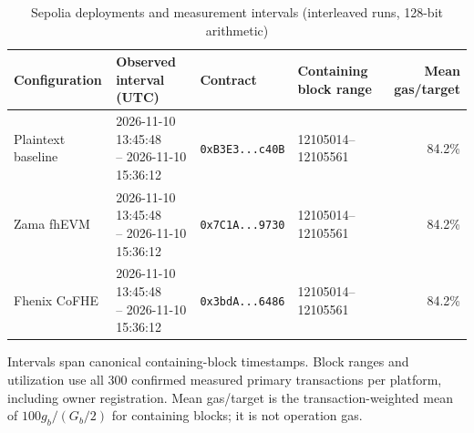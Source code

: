 \begin{table}[!t]
\caption{Sepolia deployments and measurement intervals (interleaved runs, 128-bit arithmetic)}
\label{tab:sepolia-experiment-deployments-128-blockintervals}
\centering
\footnotesize
\setlength{\tabcolsep}{4pt}
\begin{tabular}{|l|l|l|l|r|}
\hline
\textbf{Configuration} &
\textbf{Observed interval (UTC)} &
\textbf{Contract} &
\textbf{Containing block range} &
\textbf{Mean gas/target} \\
\hline
Plaintext baseline &
\shortstack[l]{2026-11-10 13:45:48 \\ -- 2026-11-10 15:36:12} &
\texttt{0xB3E3...c40B} &
12105014--12105561 &
84.2\% \\
\hline
Zama fhEVM &
\shortstack[l]{2026-11-10 13:45:48 \\ -- 2026-11-10 15:36:12} &
\texttt{0x7C1A...9730} &
12105014--12105561 &
84.2\% \\
\hline
Fhenix CoFHE &
\shortstack[l]{2026-11-10 13:45:48 \\ -- 2026-11-10 15:36:12} &
\texttt{0x3bdA...6486} &
12105014--12105561 &
84.2\% \\
\hline
\end{tabular}
\vspace{2pt}
\parbox{\textwidth}{\scriptsize Intervals span canonical containing-block timestamps. Block ranges and utilization use all 300 confirmed measured primary transactions per platform, including owner registration. Mean gas/target is the transaction-weighted mean of $100g_b/(G_b/2)$ for containing blocks; it is not operation gas.}
\end{table}
